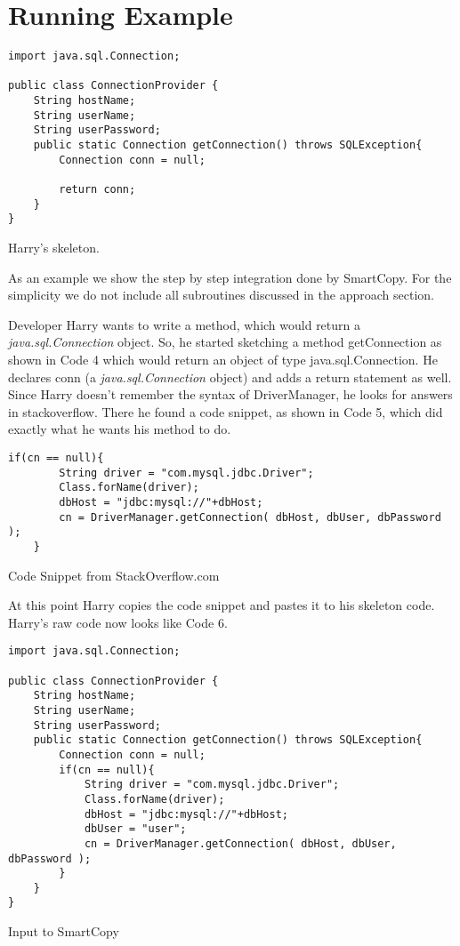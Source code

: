 \section{Running Example}
\begin{code}[H]
\begin{lstlisting}[style=javastyle]
import java.sql.Connection;

public class ConnectionProvider {
	String hostName;
	String userName;
	String userPassword;
	public static Connection getConnection() throws SQLException{
		Connection conn = null;
		
		return conn;
	}
}
\end{lstlisting}
\vspace{\spacebeforecaption{}}
\caption{\label{cd:before}Harry's skeleton.}
\end{code}





As an example we show the step by step integration done by SmartCopy. For the simplicity we do not include all subroutines discussed in the approach section.\par Developer Harry wants to write a method, which would return a \textit{java.sql.Connection} object. So, he started sketching a method getConnection as shown in  Code 4 which would return an object of type java.sql.Connection. He declares conn (a \textit{java.sql.Connection} object) and adds a return statement as well. Since Harry doesn\rq t remember the syntax of DriverManager, he looks for answers in stackoverflow. There he found a code snippet, as shown in Code 5, which did exactly what he wants his method to do. 
\begin{code}[H]
\begin{lstlisting}[style=javastyle]
	if(cn == null){
	    String driver = "com.mysql.jdbc.Driver";
	    Class.forName(driver);
	    dbHost = "jdbc:mysql://"+dbHost;
	    cn = DriverManager.getConnection( dbHost, dbUser, dbPassword );
	}
\end{lstlisting}
\vspace{\spacebeforecaption{}}
\caption{\label{cd:before}Code Snippet from StackOverflow.com}
\end{code}
At this point Harry copies the code snippet and pastes it to his skeleton code.
Harry\rq s raw code now looks like Code 6. 
\begin{code}[H]
\begin{lstlisting}[style=javastyle]
import java.sql.Connection;

public class ConnectionProvider {
	String hostName;
	String userName;
	String userPassword;
	public static Connection getConnection() throws SQLException{
		Connection conn = null;
		if(cn == null){
		    String driver = "com.mysql.jdbc.Driver";
		    Class.forName(driver);
		    dbHost = "jdbc:mysql://"+dbHost;
		    dbUser = "user";
		    cn = DriverManager.getConnection( dbHost, dbUser, dbPassword );
		}
	}
}
\end{lstlisting}
\vspace{\spacebeforecaption{}}
\caption{\label{cd:before}Input to SmartCopy}
\end{code}

